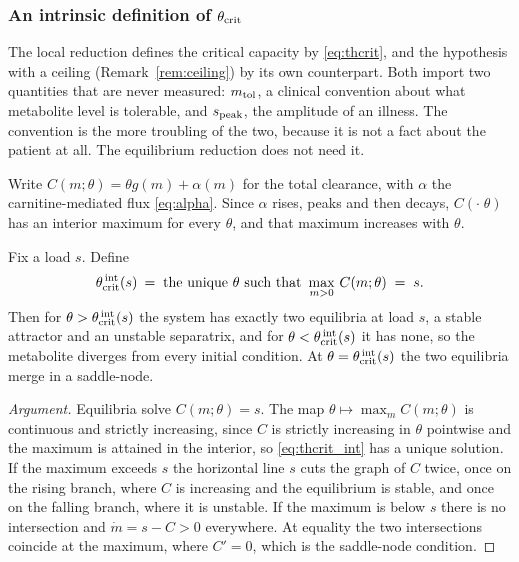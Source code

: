 \subsubsection{An intrinsic definition of $\theta_{\mathrm{crit}}$}
\label{sec:intrinsic}

The local reduction defines the critical capacity by \eqref{eq:thcrit}, and the hypothesis
with a ceiling (Remark~\ref{rem:ceiling}) by its own counterpart. Both import two quantities
that are never measured: $m_{\mathrm{tol}}$, a clinical convention about what metabolite level is tolerable, and
$s_{\mathrm{peak}}$, the amplitude of an illness. The convention is the more troubling of the two,
because it is not a fact about the patient at all. The equilibrium reduction does not need it.

Write $C(m;\theta) = \theta g(m) + \alpha(m)$ for the total clearance, with $\alpha$ the
carnitine-mediated flux \eqref{eq:alpha}. Since $\alpha$ rises, peaks and then decays,
$C(\cdot\;\theta)$ has an interior maximum for every $\theta$, and that maximum increases
with $\theta$.

\begin{proposition}
\label{prop:intrinsic}
Fix a load $s$. Define
\begin{equation}
\theta_{\mathrm{crit}}^{\,\mathrm{int}}(s) \:=\; \text{the unique } \theta \text{ such that }
\max_{m > 0}\, C(m;\theta) \;=\; s.
\label{eq:thcrit_int}
\end{equation}
Then for $\theta > \theta_{\mathrm{crit}}^{\,\mathrm{int}}(s)$ the system has exactly two equilibria at load
$s$, a stable attractor and an unstable separatrix, and for
$\theta < \theta_{\mathrm{crit}}^{\,\mathrm{int}}(s)$ it has none, so the metabolite diverges from every
initial condition. At $\theta = \theta_{\mathrm{crit}}^{\,\mathrm{int}}(s)$ the two equilibria merge in a
saddle-node.
\end{proposition}

\begin{proof}[Argument]
Equilibria solve $C(m;\theta) = s$. The map $\theta \mapsto \max_m C(m;\theta)$ is
continuous and strictly increasing, since $C$ is strictly increasing in $\theta$ pointwise
and the maximum is attained in the interior, so \eqref{eq:thcrit_int} has a unique
solution. If the maximum exceeds $s$ the horizontal line $s$ cuts the graph of $C$ twice,
once on the rising branch, where $C$ is increasing and the equilibrium is stable, and once
on the falling branch, where it is unstable. If the maximum is below $s$ there is no
intersection and $\dot m = s - C > 0$ everywhere. At equality the two intersections
coincide at the maximum, where $C' = 0$, which is the saddle-node condition.
\end{proof}

